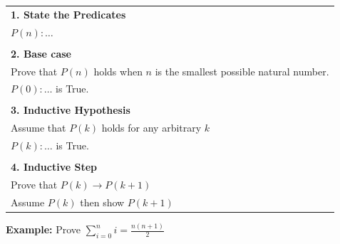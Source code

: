 \documentclass{article}
\begin{document}
\begin{center}
\begin{tabular}{l}
\textbf{1. State the Predicates}\\
$P(n): \dots$\\

 \\

\textbf{2. Base case}\\
Prove that $P(n)$ holds when $n$ is the smallest possible natural number.\\
$P(0): \dots$ is True.\\

 \\

\textbf{3. Inductive Hypothesis}\\
Assume that $P(k)$ holds for any arbitrary $k$\\
$P(k): \dots$ is True.\\

 \\

\textbf{4. Inductive Step}\\
Prove that $P(k) \rightarrow P(k + 1)$\\
Assume $P(k)$ then show $P(k+1)$\\

\end{tabular}
\end{center}

\textbf{Example:} Prove   $\displaystyle \sum_{i = 0}^{n} i = \frac{n(n+1)}{2}$

\vspace{0.4cm}
\end{document}
